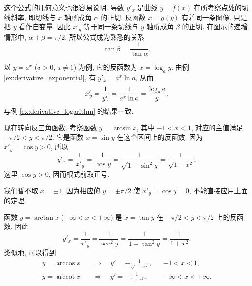 \begin{figure}
    \vspace{-0.7cm}
    \centering
    \label{fig:inverse_function_derivative}
\end{figure}
这个公式的几何意义也很容易说明.
导数 $y'_x$ 是曲线 $y=f(x)$ 在所考察点处的切线斜率,
即切线与 $x$ 轴所成角 $\alpha$ 的正切.
反函数 $x=g(y)$ 有着同一条图像, 只是把 $y$ 看作自变量.
因此 $x'_y$ 等于同一条切线与 $y$ 轴所成角 $\beta$ 的正切.
在图示的递增情形中, $\alpha+\beta=\pi/2$, 所以公式成为熟悉的关系
$$
\tan\beta=\frac1{\tan\alpha}.
$$

以 $y=a^x$ ($a>0$, $a\neq1$) 为例, 它的反函数为 $x=\log_a y$.
由例 \ref{ex:derivative_exponential}, 有 $y'_x=a^x\ln a$, 从而
$$
x'_y=\frac1{y'_x}=\frac1{a^x\ln a}=\frac{\log_a\mathrm{e}}{y},
$$
与例 \ref{ex:derivative_logarithm} 的结果一致.

\myrefparagraph{9\textdegree}\label{ex:derivative_inverse_trigonometric}
现在转向反三角函数.
考察函数 $y=\arcsin x$, 其中 $-1<x<1$,
对应的主值满足 $-\pi/2<y<\pi/2$.
它是函数 $x=\sin y$ 在这个区间上的反函数.
因为 $x'_y=\cos y>0$, 所以
$$
y'_x=\frac1{x'_y}=\frac1{\cos y}
=\frac1{\sqrt{1-\sin^2y}}=\frac1{\sqrt{1-x^2}}.
$$
这里 $\cos y>0$, 因而根式前取正号.

我们暂不取 $x=\pm1$, 因为相应的 $y=\pm\pi/2$ 使 $x'_y=\cos y=0$,
不能直接应用上面的定理.

函数 $y=\arctan x$ ($-\infty<x<+\infty$)
是 $x=\tan y$ 在 $-\pi/2<y<\pi/2$ 上的反函数.
因此
$$
y'_x=\frac1{x'_y}=\frac1{\sec^2y}
=\frac1{1+\tan^2y}=\frac1{1+x^2}.
$$
类似地, 可以得到
$$
\begin{aligned}
y=\arccos x&\quad\Longrightarrow\quad
 y'=-\frac1{\sqrt{1-x^2}},&&-1<x<1,\\
y=\operatorname{arccot}x&\quad\Longrightarrow\quad
 y'=-\frac1{1+x^2},&&-\infty<x<+\infty.
\end{aligned}
$$

